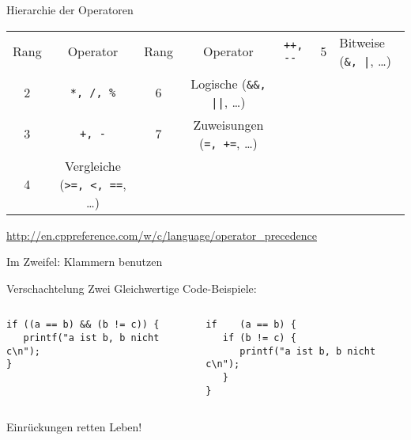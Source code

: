 \begin{frame}[fragile]{Hierarchie der Operatoren}
%
\begin{tcolorbox}%
%
\begin{tabularx}
	{\linewidth}
	{cc|cc}
	
	Rang & Operator            &  Rang & Operator                                 & \texttt{++, -{}-}   &  5    & Bitweise (\texttt{\&, |}, \ldots)    \\
	2    & \texttt{*, /, \%}   &  6    & Logische (\texttt{\&\&, ||}, \ldots) \\
	3    & \texttt{+, -}       &  7    & Zuweisungen (\texttt{=, +=}, \ldots) \\
	4    & Vergleiche (\texttt{>=, <, ==}, \ldots) \\
	
\end{tabularx}
\phantom{}\newline
%
\scriptsize \url{http://en.cppreference.com/w/c/language/operator_precedence}
\end{tcolorbox}
%
\begin{hintbox}
Im Zweifel: Klammern benutzen
\end{hintbox}
%
\end{frame}


\begin{frame}[fragile]{Verschachtelung}
%
Zwei Gleichwertige Code-Beispiele:
%
\begin{columns}[T]
\begin{codebox}
\begin{verbatim}
if ((a == b) && (b != c)) {
   printf("a ist b, b nicht c\n");
}
\end{verbatim}
\end{codebox}
%
\begin{codebox}[Verschachtelung]
\begin{verbatim}
if    (a == b) {
   if (b != c) {
      printf("a ist b, b nicht c\n");
   }
}
\end{verbatim}
\end{codebox}
\end{columns}
%
\begin{hintbox}
Einrückungen retten Leben!
\end{hintbox}
%
\end{frame}

